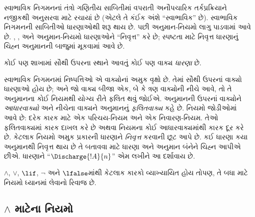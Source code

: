 \begingroup
\makeatletter{}\makeatother


\label{guunit:OLP-0085}


\begin{explain}
સ્વાભાવિક નિગમનનાં તંત્રો ગણિતીય સાબિતીમાં વપરાતી અનૌપચારિક
તર્કપ્રક્રિયાને નજીકથી અનુસરવા માટે રચાયાં છે (એટલે તે કંઈક અંશે
``સ્વાભાવિક'' છે). સ્વાભાવિક નિગમનની સાબિતીઓ ધારણાઓથી શરૂ થાય છે.
પછી અનુમાન-નિયમો લાગુ પાડવામાં આવે છે. \Intro{\lnot}, \Intro{\lif},
\Elim{\lor} અને \Elim{\lexists}
અનુમાન-નિયમો ધારણાઓને ``નિવૃત્ત'' કરે છે; સ્પષ્ટતા માટે
નિવૃત્ત ધારણાનું ચિહ્ન અનુમાનની બાજુમાં મૂકવામાં આવે છે.
\end{explain}

\begin{defn}[ધારણા]
કોઈ પણ શાખામાં સૌથી ઉપરના સ્થાને આવતું કોઈ પણ વાક્ય
\emph{ધારણા} છે.
\end{defn}

સ્વાભાવિક નિગમનમાં નિષ્પત્તિઓ એ વાક્યોનાં અમુક વૃક્ષો છે.
તેમાં સૌથી ઉપરનાં વાક્યો ધારણાઓ હોય છે; અને જો વાક્ય
બીજા એક, બે કે ત્રણ વાક્યોની નીચે આવે, તો તે અનુમાનના કોઈ નિયમથી
યોગ્ય રીતે ફલિત થવું જોઈએ. અનુમાનની ઉપરનાં વાક્યોને
\emph{આધારવાક્યો} અને નીચેના વાક્યને અનુમાનનું \emph{ફલિતવાક્ય}
કહે છે. નિયમો જોડીઓમાં આવે છે: દરેક કારક માટે એક પરિચય-નિયમ
અને એક નિવારણ-નિયમ. તેઓ ફલિતવાક્યમાં કારક દાખલ કરે છે અથવા
નિયમના કોઈ આધારવાક્યમાંથી કારક દૂર કરે છે. કેટલાક નિયમો અમુક
પ્રકારની ધારણાને \emph{નિવૃત્ત} કરવાની છૂટ આપે છે. કઈ ધારણા કયા
અનુમાનથી નિવૃત્ત થાય છે તે બતાવવા માટે ધારણા અને અનુમાન બંનેને
ચિહ્ન આપીએ છીએ. ધારણાને ``$\Discharge{!A}{n}$'' એમ લખીને આ દર્શાવાય છે.


$\land$, $\lor$, $\lif$, $\lnot$ અને $\lfalse$માંથી કેટલાક
કારકો વ્યાખ્યાયિત હોય તોપણ, તે બધા માટે નિયમો ધ્યાનમાં લેવાનો
રિવાજ છે.
\endgroup


\begingroup
\makeatletter{}\makeatother


\label{guunit:OLP-0086}



\subsection{$\land$ માટેના નિયમો}

